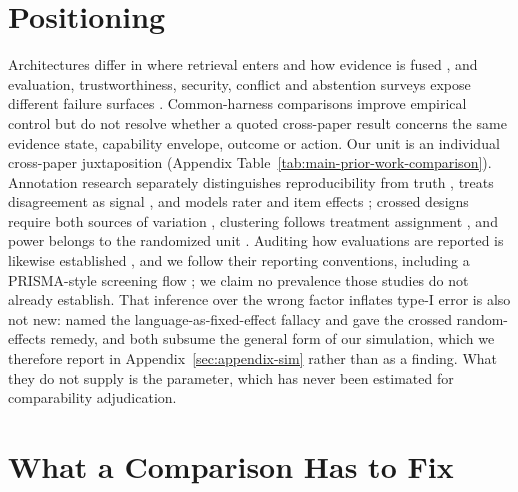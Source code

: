 \documentclass[11pt]{article}
\begin{document}
\section{Positioning}
\label{sec:related}

Architectures differ in where retrieval enters and how evidence is fused
\citep{drqa2017,knnlm2020,fid2021,retro2022,atlas2023,replug2024}, and
evaluation, trustworthiness, security, conflict and abstention surveys expose
different failure surfaces \citep{ragSurvey2024,ragEvaluationSurvey2024,
trustRAGCompass2024,securityRAGSurvey2026,xuKnowledgeConflicts2024,
wenAbstentionSurvey2025}. Common-harness comparisons improve empirical control
\citep{ragBestPractices2024,alushiRAGComparison2026} but do not resolve whether
a quoted cross-paper result concerns the same evidence state, capability
envelope, outcome or action. Our unit is an individual cross-paper
juxtaposition (Appendix Table~\ref{tab:main-prior-work-comparison}). Annotation
research separately distinguishes reproducibility from truth
\citep{artstein2008intercoder,dawid1979observer}, treats disagreement as signal
\citep{uma2021disagreement,plank2022labelvariation,davani2022disagreements},
and models rater and item effects
\citep{passonneau2014annotation,paun2018bayesian}; crossed designs require both
sources of variation \citep{baayen2008crossed}, clustering follows treatment
assignment \citep{abadie2023clustering}, and power belongs to the randomized
unit \citep{card2020power,vanmiltenburg2021preregistering}. Auditing how
evaluations are reported is likewise established
\citep{howcroft2020twenty,vanderlee2021human,belz2021systematic,
belz2023impossibility,clark2021human}, and we follow their reporting
conventions, including a PRISMA-style screening flow
\citep{page2021prisma}; we claim no prevalence those studies do not already
establish. That inference over the wrong factor inflates type-I error is also
not new: \citet{clark1973language} named the language-as-fixed-effect fallacy
and \citet{judd2012stimuli} gave the crossed random-effects remedy, and both
subsume the general form of our simulation, which we therefore report in
Appendix~\ref{sec:appendix-sim} rather than as a finding. What they do not
supply is the parameter, which has never been estimated for comparability
adjudication.

\section{What a Comparison Has to Fix}
\label{sec:estimands}
\label{sec:coordinates}
\label{sec:taxonomy}
\end{document}

